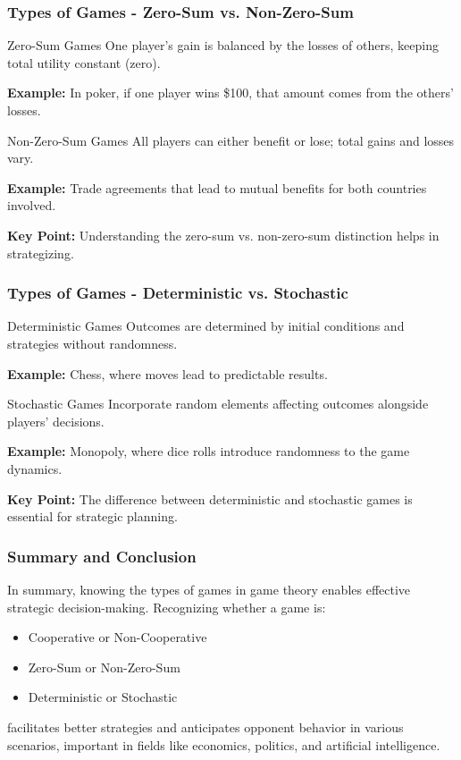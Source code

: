 \documentclass[aspectratio=169]{beamer}
\begin{document}
\begin{frame}[fragile]
    \frametitle{Types of Games - Zero-Sum vs. Non-Zero-Sum}
    \begin{block}{Zero-Sum Games}
        One player's gain is balanced by the losses of others, keeping total utility constant (zero).
        
        \textbf{Example:} In poker, if one player wins \$100, that amount comes from the others' losses.
    \end{block}

    \begin{block}{Non-Zero-Sum Games}
        All players can either benefit or lose; total gains and losses vary.
        
        \textbf{Example:} Trade agreements that lead to mutual benefits for both countries involved.
    \end{block}

    \textbf{Key Point:} Understanding the zero-sum vs. non-zero-sum distinction helps in strategizing.
\end{frame}

\begin{frame}[fragile]
    \frametitle{Types of Games - Deterministic vs. Stochastic}
    \begin{block}{Deterministic Games}
        Outcomes are determined by initial conditions and strategies without randomness.
        
        \textbf{Example:} Chess, where moves lead to predictable results.
    \end{block}

    \begin{block}{Stochastic Games}
        Incorporate random elements affecting outcomes alongside players' decisions.
        
        \textbf{Example:} Monopoly, where dice rolls introduce randomness to the game dynamics.
    \end{block}

    \textbf{Key Point:} The difference between deterministic and stochastic games is essential for strategic planning.
\end{frame}

\begin{frame}[fragile]
    \frametitle{Summary and Conclusion}
    In summary, knowing the types of games in game theory enables effective strategic decision-making. 
    Recognizing whether a game is:
    \begin{itemize}
        \item Cooperative or Non-Cooperative
        \item Zero-Sum or Non-Zero-Sum
        \item Deterministic or Stochastic
    \end{itemize}
    facilitates better strategies and anticipates opponent behavior in various scenarios, important in fields like economics, politics, and artificial intelligence.
\end{frame}
\end{document}
